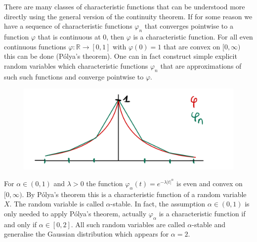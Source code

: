 There are many classes of characteristic functions that can be understood more directly using the general version of the continuity theorem. If for some reason we have a sequence of characteristic functions $\varphi_n$ that converges pointwise to a function $\varphi$ that is continuous at $0$, then $\varphi$ is a characteristic function. For all even continuous functions $\varphi \colon \mathbb{R} \to [0,1]$ with $\varphi(0)=1$ that are convex on $[0,\infty)$ this can be done (P\'olya's theorem). One can in fact construct simple explicit random variables which characteristic functions $\varphi_n$ that are  approximations of such such functions and converge pointwise to $\varphi$.

\begin{figure}[h]
	\begin{center}
		\includegraphics[scale=0.07]{characteristic.jpeg}
	\end{center}
	\vspace{-9mm}
	\end{figure}



\begin{example}
	For $\alpha\in (0,1)$ and $\lambda>0$ the function $\varphi_{\alpha}(t) = e^{- \lambda \lvert t \rvert^{\alpha}}$ is even and convex on $[0,\infty)$. By P\'olya's theorem this is a characteristic function of a random variable $X$. The random variable is called $\alpha$-stable. In fact, the assumption $\alpha\in (0,1)$ is only needed to apply P\'olya's theorem, actually $\varphi_\alpha$ is a characteristic function if and only if $\alpha\in [0,2]$. All such random variables are called $\alpha$-stable and generalise the Gaussian distribution which appears for $\alpha=2$.
\end{example}


	\marginpar{\textcolor{red}{Lecture 18}}



